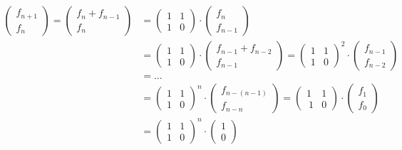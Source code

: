 \documentclass{article}
\newcommand{\vvec}[2]{\begin{pmatrix}#1\\#2\end{pmatrix}}
\begin{document}
\begin{align*}
    \vvec{f_{n + 1}}{f_n} = \vvec{f_n + f_{n-1}}{f_n} &= \begin{pmatrix}
        1 & 1\\
        1 & 0
    \end{pmatrix} \cdot \vvec{f_n}{f_{n - 1}}\\
    &= \begin{pmatrix}
        1 & 1\\
        1 & 0
    \end{pmatrix} \cdot \vvec{f_{n-1} + f_{n - 2}}{f_{n - 1}} = \begin{pmatrix}
        1 & 1\\
        1 & 0
    \end{pmatrix}^2 \cdot \vvec{f_{n-1}}{f_{n-2}}\\
    &= \dots\\
    &= \begin{pmatrix}
        1 & 1\\
        1 & 0
    \end{pmatrix}^n \cdot \vvec{f_{n-(n-1)}}{f_{n-n}} = \begin{pmatrix}
        1 & 1\\\
        1 & 0
    \end{pmatrix} \cdot \vvec{f_1}{f_0}\\
    &= \begin{pmatrix}
        1 & 1\\
        1 & 0
    \end{pmatrix}^n \cdot \vvec{1}{0}
\end{align*}
\end{document}
